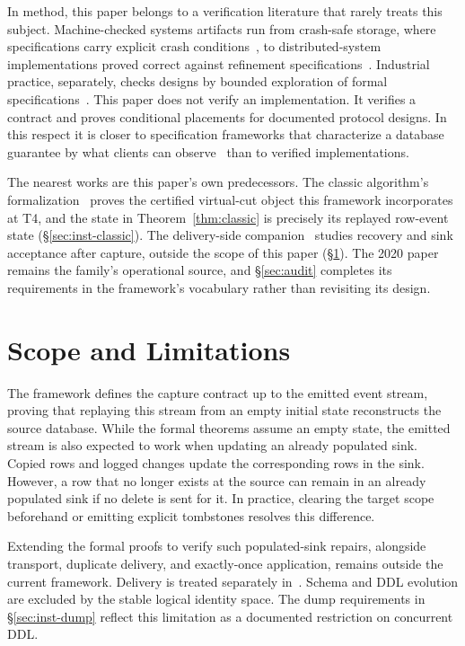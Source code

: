 \documentclass[sigconf,nonacm,10pt]{acmart}
\theoremstyle{plain}
\theoremstyle{definition}
\begin{document}
In method, this paper belongs to a verification literature that rarely treats this subject. Machine-checked systems artifacts run from
crash-safe storage, where specifications carry explicit crash
conditions~\cite{chen2015fscq}, to distributed-system implementations
proved correct against refinement
specifications~\cite{hawblitzel2015ironfleet}. Industrial
practice, separately, checks designs by bounded exploration of
formal specifications~\cite{newcombe2015amazon}. This paper does
not verify an implementation. It verifies a contract and proves
conditional placements for documented protocol designs. In this
respect it is closer to specification frameworks that characterize
a database guarantee by what clients can observe~\cite{crooks2017seeing}
than to verified implementations.

The nearest works are this paper's own predecessors. The classic
algorithm's formalization~\cite{andreakis2026virtualcuts} proves
the certified virtual-cut object this framework incorporates at T4,
and the state in Theorem~\ref{thm:classic} is precisely its
replayed row-event state (\S\ref{sec:inst-classic}). The delivery-side
companion~\cite{andreakis2026dualwrite} studies recovery and sink acceptance
after capture, outside the scope of this paper (\S\ref{sec:fence}). The 2020
paper~\cite{andreakis2020dblog} remains the family's operational
source, and \S\ref{sec:audit} completes its requirements in the
framework's vocabulary rather than revisiting its design.

\section{Scope and Limitations}\label{sec:fence}

The framework defines the capture contract up to the emitted event stream, 
proving that replaying this stream from an empty initial state reconstructs the source database. 
While the formal theorems assume an empty state, the emitted stream is also expected to work 
when updating an already populated sink. Copied rows and logged changes update the corresponding 
rows in the sink. However, a row that no longer exists at the source can remain in an already 
populated sink if no delete is sent for it. In practice, clearing the target scope beforehand or 
emitting explicit tombstones resolves this difference. 

Extending the formal proofs to verify such populated-sink repairs, 
alongside transport, duplicate delivery, and exactly-once application, remains outside the current 
framework. Delivery is treated separately in~\cite{andreakis2026dualwrite}. Schema and DDL 
evolution are excluded by the stable logical identity space. The dump requirements in 
\S\ref{sec:inst-dump} reflect this limitation as a documented restriction on concurrent DDL.
\end{document}
